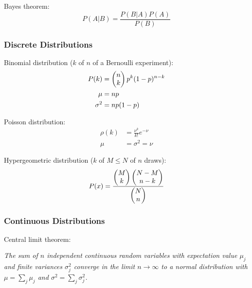 			\noindent
			Bayes theorem:
			\begin{equation}
				P(A|B) = \frac{P(B|A)P(A)}{P(B)}
			\end{equation}

		\subsubsection{Discrete Distributions}
			\noindent
			Binomial distribution ($k$ of $n$ of a Bernoulli experiment):
			\begin{equation}
				\begin{aligned}
					P(k)&=\left(\begin{matrix}n\\k\end{matrix}\right)p^k(1-p)^{n-k} \\
					\mu &= np \\
					\sigma^2 &= np(1-p)
				\end{aligned}
			\end{equation}

			\noindent
			Poisson distribution:
			\begin{equation}
				\begin{aligned}
					\rho(k) &= \frac{\nu^k}{k!} e^{-\nu} \\
					\mu &= \sigma^2 = \nu
				\end{aligned}
			\end{equation}

			\noindent
			Hypergeometric distribution ($k$ of $M\le N$ of $n$ draws):
			\begin{equation}
				P(x)=\frac{\left(\begin{matrix}M\\k\end{matrix}\right)\left(\begin{matrix}N-M\\n-k\end{matrix}\right)}{\left(\begin{matrix}N\\n\end{matrix}\right)}
			\end{equation}

		\subsubsection{Continuous Distributions}
			\noindent
			Central limit theorem: \par
				\emph{The sum of $n$ independent continuous random variables with expectation value $\mu_j$ and finite variances $\sigma_j^2$ converge in the limit $n\rightarrow \infty$ to a normal distribution with $\mu = \sum_j \mu_j$ and $\sigma^2 = \sum_j \sigma_j^2$.} \vsp

